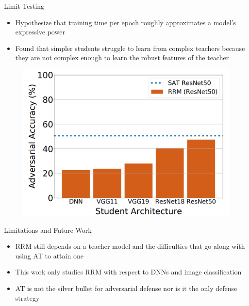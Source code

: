 \documentclass{beamer}
\begin{document}
\begin{frame}{Limit Testing}
	
	\begin{itemize}
		\item Hypothesize that training time per epoch roughly approximates a model's expressive power
		\item Found that simpler students struggle to learn from complex teachers because they are not complex enough to learn the robust features of the teacher
	\end{itemize}

	\begin{figure}
		\centering
		\includegraphics[scale=.40]{./images/limit_testing.png}
		\caption{}
	\end{figure}
	
\end{frame}


\begin{frame}{Limitations and Future Work}
	
	\begin{itemize}
		\item RRM still depends on a teacher model and the difficulties that go along with using AT to attain one
		\item This work only studies RRM with respect to DNNs and image classification
		\item AT is not the silver bullet for adversarial defense nor is it the only defense strategy
	\end{itemize}
	
\end{frame}
\end{document}
